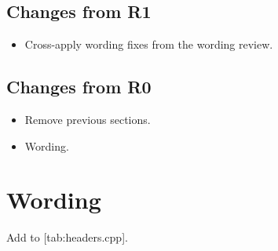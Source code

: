 \subsection{Changes from R1}

\begin{itemize}
  \item Cross-apply wording fixes from the  wording review.
\end{itemize}

\subsection{Changes from R0}

\begin{itemize}
  \item Remove previous sections.
  \item Wording.
\end{itemize}

\section{Wording}

Add  to [tab:headers.cpp].
